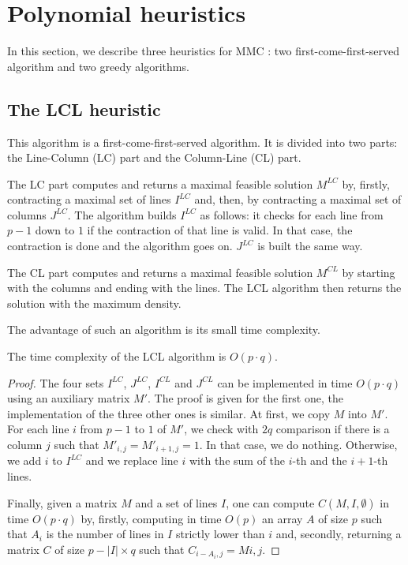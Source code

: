 
\section{Polynomial heuristics}
\label{sect:heuristics}

In this section, we describe three heuristics for MMC : two first-come-first-served algorithm and two greedy algorithms.

\subsection{The LCL heuristic}

This algorithm is a first-come-first-served algorithm. It is divided into two parts: the Line-Column (LC) part and the Column-Line (CL) part. 

The LC part computes and returns a maximal feasible solution $M^{LC}$ by, firstly, contracting a maximal set of lines $I^{LC}$ and, then, by contracting a maximal set of columns $J^{LC}$. The algorithm builds $I^{LC}$ as follows: it checks for each line from $p-1$ down to $1$ if the contraction of that line is valid. In that case, the contraction is done and the algorithm goes on. $J^{LC}$ is built the same way.

The CL part computes and returns a maximal feasible solution $M^{CL}$ by starting with the columns and ending with the lines. The LCL algorithm then returns the solution with the maximum density.

The advantage of such an algorithm is its small time complexity.

\begin{theorem}
	The time complexity of the LCL algorithm is $O(p \cdot q)$. 
\end{theorem}
\begin{proof}
	The four sets $I^{LC}$, $J^{LC}$, $I^{CL}$ and $J^{CL}$ can be implemented in time $O(p \cdot q)$ using an auxiliary matrix $M'$. The proof is given for the first one, the implementation of the three other ones is similar. At first, we copy $M$ into $M'$. For each line $i$ from $p-1$ to $1$ of $M'$, we check with $2q$ comparison if there is a column $j$ such that $M'_{i,j} = M'_{i+1,j} = 1$. In that case, we do nothing. Otherwise, we add $i$ to $I^{LC}$ and we replace line $i$ with the sum of the $i$-th and the $i+1$-th lines.
	
	Finally, given a matrix $M$ and a set of lines $I$, one can compute $C(M,I,\emptyset)$ in time $O(p \cdot q)$ by, firstly, computing in time $O(p)$ an array $A$ of size $p$ such that $A_i$ is the number of lines in $I$ strictly lower than $i$ and, secondly, returning a matrix $C$ of size $p - |I| \times q$ such that $C_{i-A_i,j} = M{i,j}$.
\end{proof}

